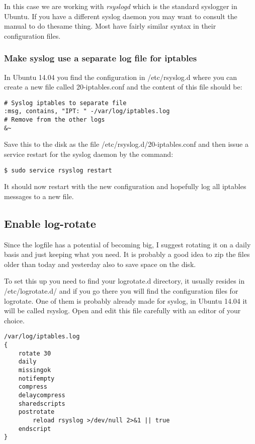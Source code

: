 \documentclass[english,twoside,openright,a4paper,12pt]{article}
\begin{document}
In this case we are working with \textit{rsyslogd} which is the
standard syslogger in Ubuntu. If you have a different syslog daemon
you may want to consult the manual to do thesame thing. Most have
fairly similar syntax in their configuration files.

\subsubsection{Make syslog use a separate log file for iptables}

In Ubuntu 14.04 you find the configuration in /etc/rsyslog.d where you
can create a new file called 20-iptables.conf and the content of this
file should be:

\begin{verbatim}
# Syslog iptables to separate file
:msg, contains, "IPT: " -/var/log/iptables.log 
# Remove from the other logs
&~
\end{verbatim}

Save this to the disk as the file /etc/rsyslog.d/20-iptables.conf and
then issue a service restart for the syslog daemon by the command:

\begin{verbatim}
$ sudo service rsyslog restart
\end{verbatim}

It should now restart with the new configuration and hopefully log all
iptables messages to a new file.

\subsection{Enable log-rotate}

Since the logfile has a potential of becoming big, I suggest rotating
it on a daily basis and just keeping what you need. It is probably a
good idea to zip the files older than today and yesterday also to save
space on the disk.

To set this up you need to find your logrotate.d directory, it usually
resides in /etc/logrotate.d/ and if you go there you will find the
configuration files for logrotate. One of them is probably already
made for syslog, in Ubuntu 14.04 it will be called rsyslog. Open and
edit this file carefully with an editor of your choice.

\begin{verbatim}
/var/log/iptables.log
{
    rotate 30
    daily 
    missingok 
    notifempty 
    compress 
    delaycompress 
    sharedscripts 
    postrotate 
        reload rsyslog >/dev/null 2>&1 || true 
    endscript
}
\end{verbatim}
\end{document}
